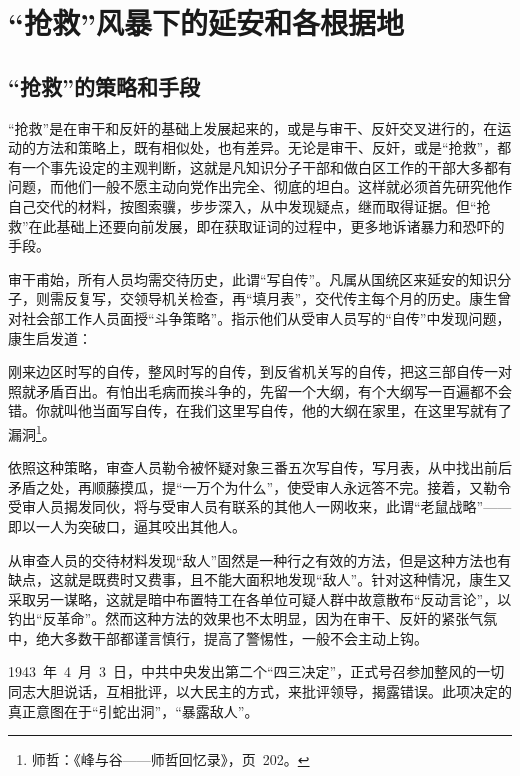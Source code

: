 
\chapter{“抢救”风暴下的延安和各根据地}

\section{“抢救”的策略和手段}

“抢救”是在审干和反奸的基础上发展起来的，或是与审干、反奸交叉进行的，在运动的方法和策略上，既有相似处，也有差异。无论是审干、反奸，或是“抢救”，都有一个事先设定的主观判断，这就是凡知识分子干部和做白区工作的干部大多都有问题，而他们一般不愿主动向党作出完全、彻底的坦白。这样就必须首先研究他作自己交代的材料，按图索骥，步步深入，从中发现疑点，继而取得证据。但“抢救”在此基础上还要向前发展，即在获取证词的过程中，更多地诉诸暴力和恐吓的手段。

审干甫始，所有人员均需交待历史，此谓“写自传”。凡属从国统区来延安的知识分子，则需反复写，交领导机关检查，再“填月表”，交代传主每个月的历史。康生曾对社会部工作人员面授“斗争策略”。指示他们从受审人员写的“自传”中发现问题，康生启发道：

\begin{quoting}
刚来边区时写的自传，整风时写的自传，到反省机关写的自传，把这三部自传一对照就矛盾百出。有怕出毛病而挨斗争的，先留一个大纲，有个大纲写一百遍都不会错。你就叫他当面写自传，在我们这里写自传，他的大纲在家里，在这里写就有了漏洞\footnote{师哲：《峰与谷——师哲回忆录》，页~202。}。
\end{quoting}

依照这种策略，审查人员勒令被怀疑对象三番五次写自传，写月表，从中找出前后矛盾之处，再顺藤摸瓜，提“一万个为什么”，使受审人永远答不完。接着，又勒令受审人员揭发同伙，将与受审人员有联系的其他人一网收来，此谓“老鼠战略”——即以一人为突破口，逼其咬出其他人。

从审查人员的交待材料发现“敌人”固然是一种行之有效的方法，但是这种方法也有缺点，这就是既费时又费事，且不能大面积地发现“敌人”。针对这种情况，康生又采取另一谋略，这就是暗中布置特工在各单位可疑人群中故意散布“反动言论”，以钓出“反革命”。然而这种方法的效果也不太明显，因为在审干、反奸的紧张气氛中，绝大多数干部都谨言慎行，提高了警惕性，一般不会主动上钩。

1943~年~4~月~3~日，中共中央发出第二个“四三决定”，正式号召参加整风的一切同志大胆说话，互相批评，以大民主的方式，来批评领导，揭露错误。此项决定的真正意图在于“引蛇出洞”，“暴露敌人”。

